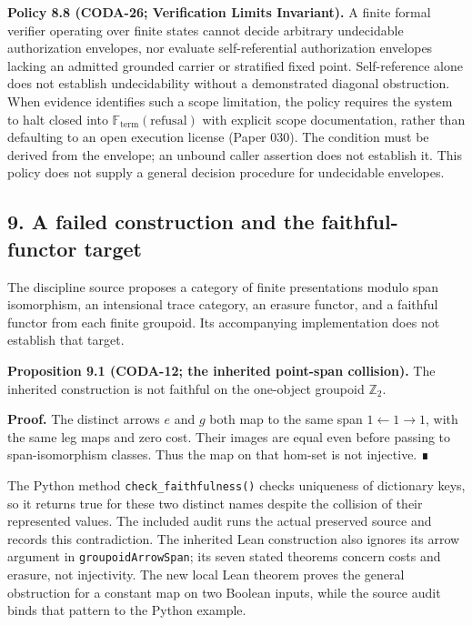 \documentclass[
  11pt,
]{article}
\begin{document}
\textbf{Policy 8.8 (CODA-26; Verification Limits Invariant).} A finite formal verifier operating over finite states cannot decide arbitrary undecidable authorization envelopes, nor evaluate self-referential authorization envelopes lacking an admitted grounded carrier or stratified fixed point. Self-reference alone does not establish undecidability without a demonstrated diagonal obstruction. When evidence identifies such a scope limitation, the policy requires the system to halt closed into \(\mathbb{F}_{\mathrm{term}}(\text{refusal})\) with explicit scope documentation, rather than defaulting to an open execution license (Paper 030). The condition must be derived from the envelope; an unbound caller assertion does not establish it. This policy does not supply a general decision procedure for undecidable envelopes.

\subsection{9. A failed construction and the faithful-functor target}\label{a-failed-construction-and-the-faithful-functor-target}

The discipline source proposes a category of finite presentations modulo span isomorphism, an intensional trace category, an erasure functor, and a faithful functor from each finite groupoid. Its accompanying implementation does not establish that target.

\textbf{Proposition 9.1 (CODA-12; the inherited point-span collision).} The inherited construction is not faithful on the one-object groupoid \(\mathbb Z_2\).

\textbf{Proof.} The distinct arrows \(e\) and \(g\) both map to the same span \(1\leftarrow1\to1\), with the same leg maps and zero cost. Their images are equal even before passing to span-isomorphism classes. Thus the map on that hom-set is not injective. ∎

The Python method \texttt{check\_faithfulness()} checks uniqueness of dictionary keys, so it returns true for these two distinct names despite the collision of their represented values. The included audit runs the actual preserved source and records this contradiction. The inherited Lean construction also ignores its arrow argument in \texttt{groupoidArrowSpan}; its seven stated theorems concern costs and erasure, not injectivity. The new local Lean theorem proves the general obstruction for a constant map on two Boolean inputs, while the source audit binds that pattern to the Python example.
\end{document}
